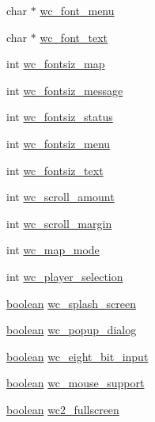 \begin{DoxyCompactItemize}
\item 
char $\ast$ \hyperlink{structinstance__flags_a2feb69a3cf238cd4018f1c76f622ad17}{wc\+\_\+font\+\_\+menu}
\item 
char $\ast$ \hyperlink{structinstance__flags_adadc7a55169eda5a908c200536396872}{wc\+\_\+font\+\_\+text}
\item 
int \hyperlink{structinstance__flags_a4d412325a8f75b8c708d5f65c2be84fb}{wc\+\_\+fontsiz\+\_\+map}
\item 
int \hyperlink{structinstance__flags_a926efa0da25728957b82ffd8ac0c2ef9}{wc\+\_\+fontsiz\+\_\+message}
\item 
int \hyperlink{structinstance__flags_afc85b364ccf07dbaf9e752ed5989d55e}{wc\+\_\+fontsiz\+\_\+status}
\item 
int \hyperlink{structinstance__flags_adc1e0097a78217c13f627b0ded61338d}{wc\+\_\+fontsiz\+\_\+menu}
\item 
int \hyperlink{structinstance__flags_aed0e7dbf1efecc62fb651e1e6042cb78}{wc\+\_\+fontsiz\+\_\+text}
\item 
int \hyperlink{structinstance__flags_ae26c02a271148327f70765f3ae5088af}{wc\+\_\+scroll\+\_\+amount}
\item 
int \hyperlink{structinstance__flags_acc0ddbf55d8eaa67df7b5a70d17448b8}{wc\+\_\+scroll\+\_\+margin}
\item 
int \hyperlink{structinstance__flags_a10495720747b71f0c42953aa2b96d5b5}{wc\+\_\+map\+\_\+mode}
\item 
int \hyperlink{structinstance__flags_a8c8a16eb50807ff19905909a1549e1a3}{wc\+\_\+player\+\_\+selection}
\item 
\hyperlink{global_8h_a531b10dd351aa162d7dcccd1966308b8}{boolean} \hyperlink{structinstance__flags_af3b9b6490dafb584b08eebd3c6afc71c}{wc\+\_\+splash\+\_\+screen}
\item 
\hyperlink{global_8h_a531b10dd351aa162d7dcccd1966308b8}{boolean} \hyperlink{structinstance__flags_ad05c48ad36fa58a2a5dc55fbe8bc7d92}{wc\+\_\+popup\+\_\+dialog}
\item 
\hyperlink{global_8h_a531b10dd351aa162d7dcccd1966308b8}{boolean} \hyperlink{structinstance__flags_a80d99b815577eef2cb9c7e325f188daa}{wc\+\_\+eight\+\_\+bit\+\_\+input}
\item 
\hyperlink{global_8h_a531b10dd351aa162d7dcccd1966308b8}{boolean} \hyperlink{structinstance__flags_ac319f8f3ce967aecfa87845d203f8691}{wc\+\_\+mouse\+\_\+support}
\item 
\hyperlink{global_8h_a531b10dd351aa162d7dcccd1966308b8}{boolean} \hyperlink{structinstance__flags_a638a1aa6b9b6e53d7089d1baa3a1b05a}{wc2\+\_\+fullscreen}

\end{DoxyCompactItemize}
